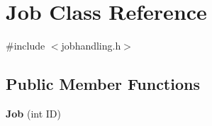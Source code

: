 \hypertarget{classJob}{}\section{Job Class Reference}
\label{classJob}


{\ttfamily \#include $<$jobhandling.\+h$>$}

\subsection*{Public Member Functions}
\begin{DoxyCompactItemize}
\item 
\mbox{\label{classJob_ac7bd0c01cf61901df90b062f9a32cf02}} 
{\bfseries Job} (int ID)
\end{DoxyCompactItemize}
